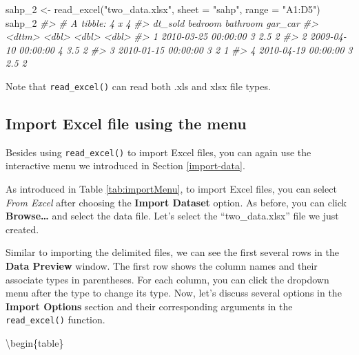 \documentclass[
]{book}
\newenvironment{Shaded}{\begin{snugshade}}{\end{snugshade}}
\newcommand{\AttributeTok}[1]{\textcolor[rgb]{0.77,0.63,0.00}{#1}}
\newcommand{\CommentTok}[1]{\textcolor[rgb]{0.56,0.35,0.01}{\textit{#1}}}
\newcommand{\FunctionTok}[1]{\textcolor[rgb]{0.00,0.00,0.00}{#1}}
\newcommand{\NormalTok}[1]{#1}
\newcommand{\OtherTok}[1]{\textcolor[rgb]{0.56,0.35,0.01}{#1}}
\newcommand{\StringTok}[1]{\textcolor[rgb]{0.31,0.60,0.02}{#1}}
\begin{document}
\begin{Shaded}
\begin{Highlighting}[]
\NormalTok{sahp\_2 }\OtherTok{\textless{}{-}} \FunctionTok{read\_excel}\NormalTok{(}\StringTok{"two\_data.xlsx"}\NormalTok{, }\AttributeTok{sheet =} \StringTok{"sahp"}\NormalTok{, }\AttributeTok{range =} \StringTok{"A1:D5"}\NormalTok{)}
\NormalTok{sahp\_2}
\CommentTok{\#\textgreater{} \# A tibble: 4 x 4}
\CommentTok{\#\textgreater{}   dt\_sold             bedroom bathroom gar\_car}
\CommentTok{\#\textgreater{}   \textless{}dttm\textgreater{}                \textless{}dbl\textgreater{}    \textless{}dbl\textgreater{}   \textless{}dbl\textgreater{}}
\CommentTok{\#\textgreater{} 1 2010{-}03{-}25 00:00:00       3      2.5       2}
\CommentTok{\#\textgreater{} 2 2009{-}04{-}10 00:00:00       4      3.5       2}
\CommentTok{\#\textgreater{} 3 2010{-}01{-}15 00:00:00       3      2         1}
\CommentTok{\#\textgreater{} 4 2010{-}04{-}19 00:00:00       3      2.5       2}
\end{Highlighting}
\end{Shaded}

Note that \texttt{read\_excel()} can read both .xls and xlsx file types.

\hypertarget{import-excel-file-using-the-menu}{%
\subsection{Import Excel file using the menu}\label{import-excel-file-using-the-menu}}

Besides using \texttt{read\_excel()} to import Excel files, you can again use the interactive menu we introduced in Section \ref{import-data}.

As introduced in Table \ref{tab:importMenu}, to import Excel files, you can select \emph{From Excel} after choosing the \textbf{Import Dataset} option. As before, you can click \textbf{Browse\ldots{}} and select the data file. Let's select the ``two\_data.xlsx'' file we just created.

Similar to importing the delimited files, we can see the first several rows in the \textbf{Data Preview} window. The first row shows the column names and their associate types in parentheses. For each column, you can click the dropdown menu after the type to change its type. Now, let's discuss several options in the \textbf{Import Options} section and their corresponding arguments in the \texttt{read\_excel()} function.

\textbackslash begin\{table\}
\end{document}
